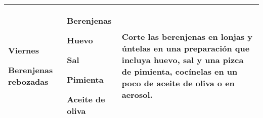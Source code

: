 \documentclass[menu.tex]{subfiles}
\begin{document}
\begin{tabular} {p{3cm} p{4.5cm} p{9cm}}
\pbox{20cm}
{
    \rule{0pt}{3ex}\begin{large}\textbf{Viernes}\end{large}\\
    \rule{0pt}{2ex}Berenjenas \\rebozadas
} & 
\vspace{-0.6cm}
\begin{compactitem} 
    \begin{footnotesize}
        \item Berenjenas
        \item Huevo
        \item Sal
        \item Pimienta
        \item Aceite de oliva
    \end{footnotesize}
\end{compactitem}&
\vspace{-0.6cm}
Corte las berenjenas en lonjas y úntelas en una preparación que incluya huevo, sal y una pizca de pimienta, cocínelas en un poco de aceite de oliva o en aerosol.\\
\hline


\end{tabular}
\end{document}
